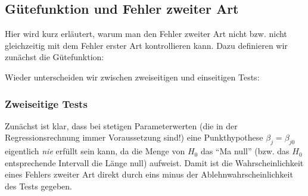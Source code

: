 \subsection{\label{sec:fehlerZweiterArt}G\"utefunktion und Fehler
zweiter Art} 
Hier wird kurz erl\"autert, warum man den Fehler zweiter Art nicht
bzw. nicht gleichzeitig mit dem Fehler erster Art kontrollieren
kann. Dazu definieren wir zun\"achst die G\"utefunktion:

\vspace{1em}

\noindent
Wieder unterscheiden wir zwischen zweiseitigen und einseitigen Tests:

\subsubsection*{Zweiseitige Tests}
Zun\"achst ist klar, dass bei stetigen Parameterwerten (die in der
Regressionsrechnung immer Voraussetzung sind!) eine Punkthypothese  
$\beta_j=\beta_{j0}$ 
eigentlich \emph{nie} erf\"ullt sein kann, da die Menge von $H_0$ das ``Ma\3
null'' (bzw. das $H_0$ entsprechende Intervall die L\"ange null)
aufweist. Damit ist die Wahrscheinlichkeit eines Fehlers
 zweiter Art direkt durch eins
minus der Ablehnwahrscheinlichkeit des Tests gegeben. 

